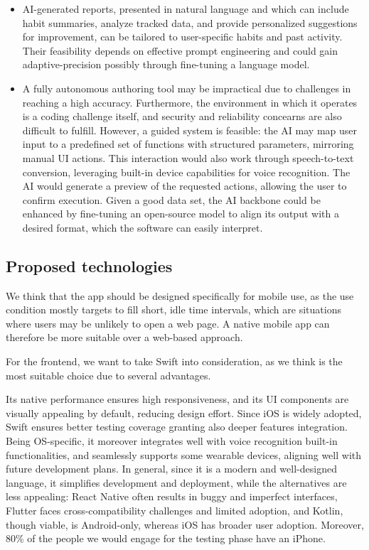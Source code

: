 \documentclass{article}
\begin{document}
\begin{itemize}

    \item AI-generated reports, presented in natural language and which can include habit summaries, analyze tracked data, and provide personalized suggestions for improvement, can be tailored to user-specific habits and past activity. Their feasibility depends on effective prompt engineering and could gain adaptive-precision possibly through fine-tuning a language model.

    \item A fully autonomous authoring tool may be impractical due to challenges in reaching a high accuracy. Furthermore, the environment in which it operates is a coding challenge itself, and security and reliability concearns are also difficult to fulfill.
        However, a guided system is feasible: the AI may map user input to a predefined set of functions with structured parameters, mirroring manual UI actions. This interaction would also work through speech-to-text conversion, leveraging built-in device capabilities for voice recognition. The AI would generate a preview of the requested actions, allowing the user to confirm execution.
        Given a good data set, the AI backbone could be enhanced by fine-tuning an open-source model to align its output with a desired format, which the software can easily interpret.

\end{itemize}

\subsection{Proposed technologies}

We think that the app should be designed specifically for mobile use, as the use condition mostly targets to fill short, idle time intervals, which are situations where users may be unlikely to open a web page.
A native mobile app can therefore be more suitable over a web-based approach.

For the frontend, we want to take Swift into consideration, as we think is the most suitable choice due to several advantages.

Its native performance ensures high responsiveness, and its UI components are visually appealing by default, reducing design effort.
Since iOS is widely adopted, Swift ensures better testing coverage granting also deeper features integration.
Being OS-specific, it moreover integrates well with voice recognition built-in functionalities, and seamlessly supports some wearable devices, aligning well with future development plans.
In general, since it is a modern and well-designed language, it simplifies development and deployment, while the alternatives are less appealing: React Native often results in buggy and imperfect interfaces, Flutter faces cross-compatibility challenges and limited adoption, and Kotlin, though viable, is Android-only, whereas iOS has broader user adoption.
Moreover, 80\% of the people we would engage for the testing phase have an iPhone.
\end{document}
